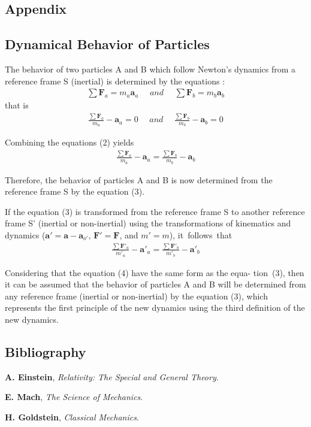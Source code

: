 \documentclass[11pt]{article}
\newcommand{\vA}{\mathbf{a}}
\newcommand{\vF}{\mathbf{F}}
\newcommand{\mM}{m}
\newcommand{\rt}{'}
\newcommand{\ra}{_a}
\newcommand{\rb}{_b}
\newcommand{\rot}{_{o'}}
\begin{document}
\newpage \baselineskip=13.60pt

{\centering\subsection*{Appendix}}

{\centering\subsection*{Dynamical Behavior of Particles}}

\par The behavior of two particles A and B which follow Newton's dynamics from a reference frame S (inertial) is determined by the equations \hspace{-0.12em}:
\begin{eqnarray}
\sum \vF\ra = \mM\ra\vA\ra \ \ \ \ \ \ and \ \ \ \ \ \ 
\sum \vF\rb = \mM\rb\vA\rb
\end{eqnarray}
\noindent that is
\begin{eqnarray}
\frac{\sum \vF\ra}{\mM\ra} - \vA\ra = 0 \ \ \ \ \ \ and \ \ \ \ \ \ 
\frac{\sum \vF\rb}{\mM\rb} - \vA\rb = 0
\end{eqnarray}
\par Combining the equations (2) yields
\begin{eqnarray}
\frac{\sum \vF\ra}{\mM\ra} - \vA\ra = \frac{\sum \vF\rb}{\mM\rb} - \vA\rb
\end{eqnarray}
\par Therefore, the behavior of particles A and B is now determined from the reference frame S by the equation (3).
\par If the equation (3) is transformed from the reference frame S to another reference frame S' (inertial or non-inertial) using the transformations of kinematics and dynamics ($\vA\rt = \vA - \vA\rot$, $\vF\rt = \vF$, and $\mM\rt = \mM$), \hbox {it follows that}
\begin{eqnarray}
\frac{\sum \vF\rt\ra}{\mM\rt\ra} - \vA\rt\ra = \frac{\sum \vF\rt\rb}{\mM\rt\rb} - \vA\rt\rb
\end{eqnarray}
\par Considering that the equation (4) have the same form as the equa- \hbox {tion (3)}, then it can be assumed that the behavior of particles A and B will be determined from any reference frame (inertial or non-inertial) by the equation (3), which represents the first principle of the new dynamics using the third definition of the new dynamics.

\medskip

{\centering\subsection*{Bibliography}}

\par \textbf{A. Einstein}, \textit{Relativity: The Special and General Theory}.
\bigskip
\par \textbf{E. Mach}, \textit{The Science of Mechanics}.
\bigskip
\par \textbf{H. Goldstein}, \textit{Classical Mechanics}.
\end{document}
